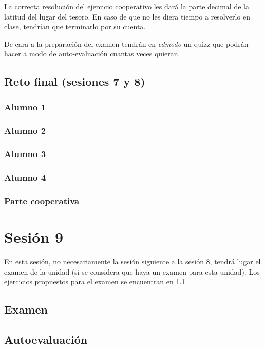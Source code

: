 La correcta resolución del ejercicio cooperativo les dará la parte decimal de la latitud del lugar del tesoro.
%
En caso de que no les diera tiempo a resolverlo en clase, tendrían que terminarlo por su cuenta.

De cara a la preparación del examen tendrán en \textit{edmodo} un quizz que podrán hacer a modo de auto-evaluación cuantas veces quieran.

\subsection{Reto final (sesiones 7 y 8)}
\label{ses7:indiv}

\subsubsection{Alumno 1}


\subsubsection{Alumno 2}


\subsubsection{Alumno 3}


\subsubsection{Alumno 4}



\subsubsection{Parte cooperativa}
\label{ses7:coop}





\section{Sesión 9}


En esta sesión, no necesariamente la sesión siguiente a la sesión 8, tendrá lugar el examen de la unidad (si se considera que haya un examen para esta unidad).
%
Los ejercicios propuestos para el examen se encuentran en \ref{examen}.


\subsection{Examen}
\label{examen}

\subsection{Autoevaluación}
\label{app:autoeval}


